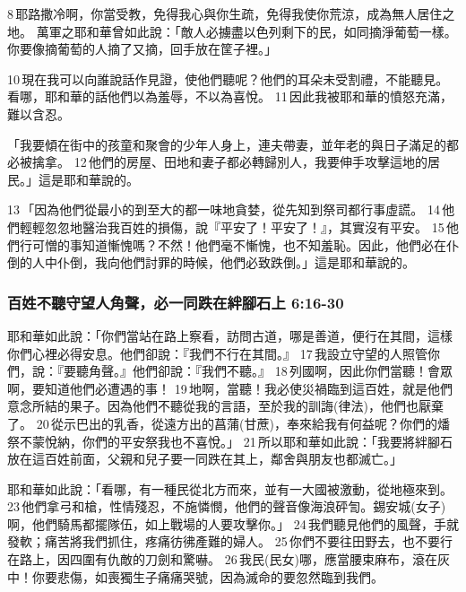  

8 耶路撒冷啊，你當受教，免得我心與你生疏，免得我使你荒涼，成為無人居住之地。
萬軍之耶和華曾如此說：「敵人必擄盡以色列剩下的民，如同摘淨葡萄一樣。你要像摘葡萄的人摘了又摘，回手放在筐子裡。」

 10 現在我可以向誰說話作見證，使他們聽呢？他們的耳朵未受割禮，不能聽見。看哪，耶和華的話他們以為羞辱，不以為喜悅。 11 因此我被耶和華的憤怒充滿，難以含忍。

「我要傾在街中的孩童和聚會的少年人身上，連夫帶妻，並年老的與日子滿足的都必被擒拿。 12 他們的房屋、田地和妻子都必轉歸別人，我要伸手攻擊這地的居民。」這是耶和華說的。 



13 「因為他們從最小的到至大的都一味地貪婪，從先知到祭司都行事虛謊。 14 他們輕輕忽忽地醫治我百姓的損傷，說『平安了！平安了！』，其實沒有平安。 15 他們行可憎的事知道慚愧嗎？不然！他們毫不慚愧，也不知羞恥。因此，他們必在仆倒的人中仆倒，我向他們討罪的時候，他們必致跌倒。」這是耶和華說的。


\subsubsection{百姓不聽守望人角聲，必一同跌在絆腳石上 6:16-30}
耶和華如此說：「你們當站在路上察看，訪問古道，哪是善道，便行在其間，這樣你們心裡必得安息。他們卻說：『我們不行在其間。』 17 我設立守望的人照管你們，說：『要聽角聲。』他們卻說：『我們不聽。』 18 列國啊，因此你們當聽！會眾啊，要知道他們必遭遇的事！ 19 地啊，當聽！我必使災禍臨到這百姓，就是他們意念所結的果子。因為他們不聽從我的言語，至於我的訓誨(律法)，他們也厭棄了。 20 從示巴出的乳香，從遠方出的菖蒲(甘蔗)，奉來給我有何益呢？你們的燔祭不蒙悅納，你們的平安祭我也不喜悅。」 21 所以耶和華如此說：「我要將絆腳石放在這百姓前面，父親和兒子要一同跌在其上，鄰舍與朋友也都滅亡。」


耶和華如此說：「看哪，有一種民從北方而來，並有一大國被激動，從地極來到。 23 他們拿弓和槍，性情殘忍，不施憐憫，他們的聲音像海浪砰訇。錫安城(女子)啊，他們騎馬都擺隊伍，如上戰場的人要攻擊你。」 24 我們聽見他們的風聲，手就發軟；痛苦將我們抓住，疼痛彷彿產難的婦人。 25 你們不要往田野去，也不要行在路上，因四圍有仇敵的刀劍和驚嚇。 26 我民(民女)哪，應當腰束麻布，滾在灰中！你要悲傷，如喪獨生子痛痛哭號，因為滅命的要忽然臨到我們。

